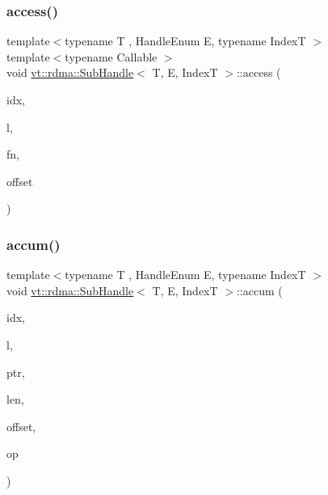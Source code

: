\subsubsection{\texorpdfstring{access()}{access()}}
{\footnotesize\ttfamily template$<$typename T , Handle\+Enum E, typename IndexT $>$ \\
template$<$typename Callable $>$ \\
void \hyperlink{structvt_1_1rdma_1_1_sub_handle}{vt\+::rdma\+::\+Sub\+Handle}$<$ T, E, IndexT $>$\+::access (\begin{DoxyParamCaption}\item[{IndexT}]{idx,  }\item[{\hyperlink{namespacevt_1_1rdma_ac5c20b41a653e520b6305d4d454ecb70}{Lock}}]{l,  }\item[{Callable}]{fn,  }\item[{uint64\+\_\+t}]{offset }\end{DoxyParamCaption})}

\mbox{\label{structvt_1_1rdma_1_1_sub_handle_ade8b9a06b32efd7533a4f626374cc6eb}} 
\subsubsection{\texorpdfstring{accum()}{accum()}}
{\footnotesize\ttfamily template$<$typename T , Handle\+Enum E, typename IndexT $>$ \\
void \hyperlink{structvt_1_1rdma_1_1_sub_handle}{vt\+::rdma\+::\+Sub\+Handle}$<$ T, E, IndexT $>$\+::accum (\begin{DoxyParamCaption}\item[{IndexT const \&}]{idx,  }\item[{\hyperlink{namespacevt_1_1rdma_ac5c20b41a653e520b6305d4d454ecb70}{Lock}}]{l,  }\item[{T $\ast$}]{ptr,  }\item[{uint64\+\_\+t}]{len,  }\item[{int}]{offset,  }\item[{M\+P\+I\+\_\+\+Op}]{op }\end{DoxyParamCaption})}

\mbox{\label{structvt_1_1rdma_1_1_sub_handle_a24f366ba0fe9d2228d82a2c766bdbf45}} 
